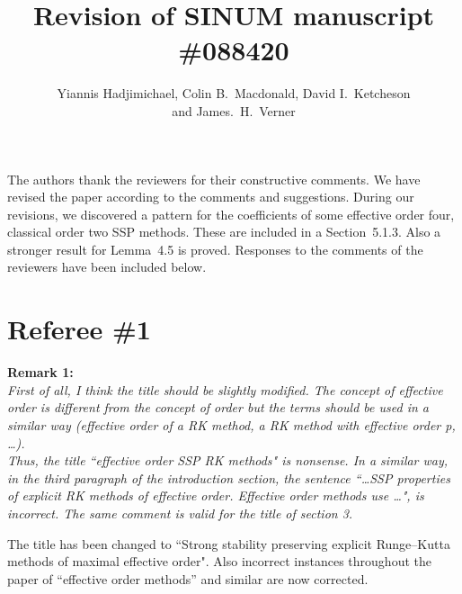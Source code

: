 \documentclass[12pt]{article}
\newcommand{\remark}[2]{\vspace{25pt} \noindent \textbf{Remark #1:\newline} \textit{#2}\vspace{15pt}}
\renewcommand{\newline}{\vspace{15pt}\\}
\begin{document}
\title{Revision of SINUM manuscript \#088420}
\author{Yiannis Hadjimichael, Colin B.~Macdonald, David I.~Ketcheson \\ and  James.~H.~Verner}

\maketitle

The authors thank the reviewers for their constructive comments.
We have revised the paper according to the comments and suggestions.
During our revisions, we discovered a pattern for the coefficients of some effective order four, 
classical order two SSP methods.
These are included in a Section~5.1.3.
Also a stronger result for Lemma~4.5 is proved.
Responses to the comments of the reviewers have been included below.
\vspace{30pt}

\section*{Referee \#1}
\remark{1}
{First of all, I think the title should be slightly modified. 
The concept of \textit{effective order} is different from the concept of \textit{order} 
but the terms should be used in a similar way (\textit{effective order of a RK method, 
a RK method with effective order p, \dots}).
\newline
Thus, the title ``effective order SSP RK methods" is nonsense.
In a similar way, in the third paragraph of the introduction section, the sentence 
``\dots SSP properties of explicit RK methods of effective order. Effective order 
methods use \dots", is incorrect.
The same comment is valid for the title of section 3.}

The title has been changed to ``Strong stability preserving explicit Runge--Kutta methods of maximal effective order". 
Also incorrect instances throughout the paper of ``effective order methods'' and similar are now corrected.
\end{document}

